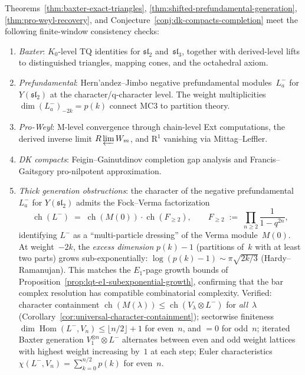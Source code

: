 \begin{remark}
\label{rem:mc3-computational-evidence}
Theorems~\ref{thm:baxter-exact-triangles},
\ref{thm:shifted-prefundamental-generation},
\ref{thm:pro-weyl-recovery}, and
Conjecture~\ref{conj:dk-compacts-completion} meet the following
finite-window consistency checks:
\begin{enumerate}[label=\textup{(\roman*)},nosep]
\item \emph{Baxter}: $K_0$-level TQ identities for
 $\mathfrak{sl}_2$ and~$\mathfrak{sl}_3$, together with derived-level
 lifts to distinguished triangles, mapping cones, and the octahedral
 axiom.
\item \emph{Prefundamental}: Hern'andez--Jimbo negative
 prefundamental modules~$L^-_a$ for $Y(\mathfrak{sl}_2)$
 at the character/q-character level. The weight multiplicities
 $\dim(L^-_a)_{-2k} = p(k)$ connect MC3 to partition theory.
\item \emph{Pro-Weyl}: M-level convergence through chain-level Ext
 computations, the derived inverse limit $R\varprojlim W_m$, and
 R$^1$ vanishing via Mittag--Leffler.
\item \emph{DK compacts}: Feigin--Gainutdinov completion gap
 analysis and Francis--Gaitsgory pro-nilpotent approximation.
\item \emph{Thick generation obstructions}: the character of the
 negative prefundamental $L^-_a$ for $Y(\mathfrak{sl}_2)$
 admits the Fock--Verma factorization
 \[
 \operatorname{ch}(L^-)
 \;=\;
 \operatorname{ch}(M(0)) \cdot \operatorname{ch}(F_{\geq 2}),
 \qquad
 F_{\geq 2}
 \;:=\;
 \prod_{n \geq 2} \frac{1}{1 - q^{2n}},
 \]
 identifying $L^-$ as a ``multi-particle dressing'' of the Verma
 module~$M(0)$. At weight~$-2k$, the \emph{excess dimension}
 $p(k) - 1$ (partitions of~$k$ with at least two parts) grows
 sub-exponentially:
 $\log(p(k)-1) \sim \pi\sqrt{2k/3}$ (Hardy--Ramanujan).
 This matches the $E_1$-page growth bounds of
 Proposition~\ref{prop:lqt-e1-subexponential-growth}, confirming
 that the bar complex resolution has compatible combinatorial
 complexity. Verified:
 character containment
 $\operatorname{ch}(M(\lambda))
 \leq \operatorname{ch}(V_\lambda \otimes L^-)$
 for \emph{all}~$\lambda$
 (Corollary~\ref{cor:universal-character-containment});
 sectorwise finiteness
 $\dim\operatorname{Hom}(L^-, V_n) \leq \lfloor n/2 \rfloor + 1$
 for even~$n$, and $= 0$ for odd~$n$;
 iterated Baxter generation $V_1^{\otimes n} \otimes L^-$
 alternates between even and odd weight lattices with
 highest weight increasing by~$1$ at each step;
 Euler characteristics
 $\chi(L^-, V_n) = \sum_{k=0}^{n/2} p(k)$ for even~$n$.
\end{enumerate}
\end{remark}

